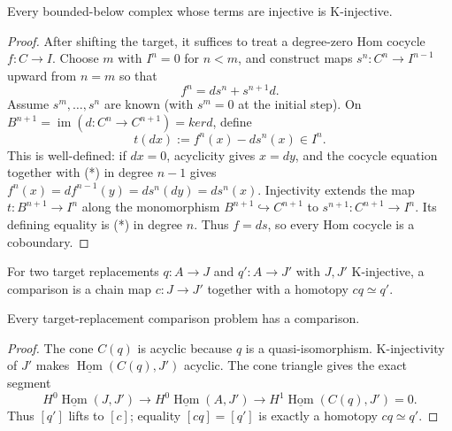 \begin{lemma}
\label{lemma:weil-pbc-derived-exchange-bounded-injective-kinjective-v5}
Every bounded-below complex whose terms are injective is K-injective.
\end{lemma}
\begin{proof}
After shifting the target, it suffices to treat a degree-zero Hom cocycle
$f:C\to I$.  Choose $m$ with $I^n=0$ for $n<m$, and construct maps
$s^n:C^n\to I^{n-1}$ upward from $n=m$ so that
\[
 f^n=d s^n+s^{n+1}d. \tag{*}
\]
Assume $s^m,\ldots,s^n$ are known (with $s^m=0$ at the initial step).
On $B^{n+1}=\operatorname{im}(d:C^n\to C^{n+1})=ker d$, define
\[
 t(d x):=f^n(x)-d s^n(x)\in I^n.
\]
This is well-defined: if $dx=0$, acyclicity gives $x=dy$, and the cocycle
equation together with (*) in degree $n-1$ gives
$f^n(x)=df^{n-1}(y)=d s^n(dy)=d s^n(x)$.  Injectivity extends the map
$t:B^{n+1}\to I^n$ along the monomorphism $B^{n+1}\hookrightarrow C^{n+1}$
to $s^{n+1}:C^{n+1}\to I^n$.  Its defining equality is (*) in degree $n$.
Thus $f=ds$, so every Hom cocycle is a coboundary.
\end{proof}

\begin{definition}
\label{def:weil-pbc-derived-exchange-target-comparison-v5}
For two target replacements $q:A\to J$ and $q':A\to J'$ with $J,J'$
K-injective, a comparison is a chain map $c:J\to J'$ together with a
homotopy $cq\simeq q'$.
\end{definition}

\begin{lemma}
\label{lemma:weil-pbc-derived-exchange-target-comparison-exists-v5}
Every target-replacement comparison problem has a comparison.
\end{lemma}
\begin{proof}
The cone $C(q)$ is acyclic because $q$ is a quasi-isomorphism.  K-injectivity
of $J'$ makes $\underline{\operatorname{Hom}}(C(q),J')$ acyclic.  The
cone triangle gives the exact segment
\[
 H^0\underline{\operatorname{Hom}}(J,J')\longrightarrow
 H^0\underline{\operatorname{Hom}}(A,J')\longrightarrow
 H^1\underline{\operatorname{Hom}}(C(q),J')=0.
\]
Thus $[q']$ lifts to $[c]$; equality $[cq]=[q']$ is exactly a homotopy
$cq\simeq q'$.
\end{proof}

